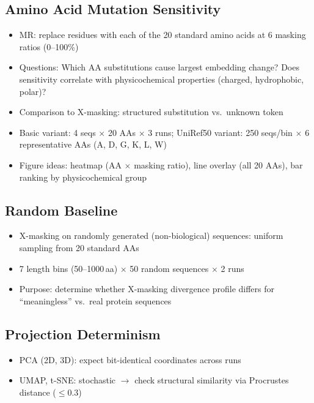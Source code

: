 \subsection{Amino Acid Mutation Sensitivity}\label{sec:exp-mutation}
\begin{itemize}
  \item MR: replace residues with each of the 20 standard amino acids at 6 masking ratios (0--100\%)
  \item Questions: Which AA substitutions cause largest embedding change? Does sensitivity correlate with physicochemical properties (charged, hydrophobic, polar)?
  \item Comparison to X-masking: structured substitution vs.\ unknown token
  \item Basic variant: 4 seqs $\times$ 20 AAs $\times$ 3 runs; UniRef50 variant: 250 seqs/bin $\times$ 6 representative AAs (A, D, G, K, L, W)
  \item Figure ideas: heatmap (AA $\times$ masking ratio), line overlay (all 20 AAs), bar ranking by physicochemical group
\end{itemize}

\subsection{Random Baseline}\label{sec:exp-random}
\begin{itemize}
  \item X-masking on randomly generated (non-biological) sequences: uniform sampling from 20 standard AAs
  \item 7 length bins (50--1000\,aa) $\times$ 50 random sequences $\times$ 2 runs
  \item Purpose: determine whether X-masking divergence profile differs for ``meaningless'' vs.\ real protein sequences
\end{itemize}

\subsection{Projection Determinism}\label{sec:exp-projection}
\begin{itemize}
  \item PCA (2D, 3D): expect bit-identical coordinates across runs
  \item UMAP, t-SNE: stochastic $\to$ check structural similarity via Procrustes distance ($\leq 0.3$)
\end{itemize}

